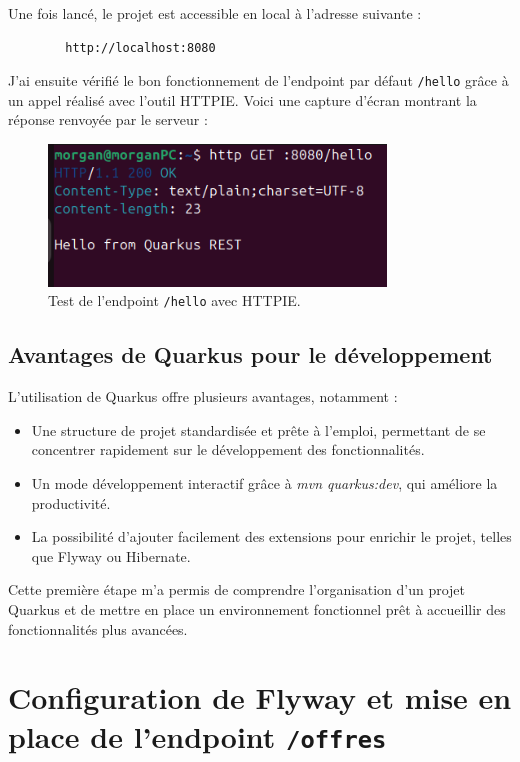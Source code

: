 \documentclass{article}
\begin{document}
	Une fois lancé, le projet est accessible en local à l’adresse suivante :
	\begin{verbatim}
		http://localhost:8080
	\end{verbatim}
	
	J’ai ensuite vérifié le bon fonctionnement de l’endpoint par défaut \texttt{/hello} grâce à un appel réalisé avec l’outil HTTPIE. Voici une capture d’écran montrant la réponse renvoyée par le serveur :
	
	\begin{figure}[h!]
		\centering
		\includegraphics[width=0.8\textwidth]{asset/hello.png}
		\caption{Test de l'endpoint \texttt{/hello} avec HTTPIE.}
		\label{fig:hello_endpoint}
	\end{figure}
	
	\subsection{Avantages de Quarkus pour le développement}
	
	L’utilisation de Quarkus offre plusieurs avantages, notamment :
	\begin{itemize}
		\item Une structure de projet standardisée et prête à l’emploi, permettant de se concentrer rapidement sur le développement des fonctionnalités.
		\item Un mode développement interactif grâce à \textit{mvn quarkus:dev}, qui améliore la productivité.
		\item La possibilité d’ajouter facilement des extensions pour enrichir le projet, telles que Flyway ou Hibernate.
	\end{itemize}
	
	Cette première étape m’a permis de comprendre l’organisation d’un projet Quarkus et de mettre en place un environnement fonctionnel prêt à accueillir des fonctionnalités plus avancées.
	
	\section{Configuration de Flyway et mise en place de l'endpoint \texttt{/offres}}
	
\end{document}
